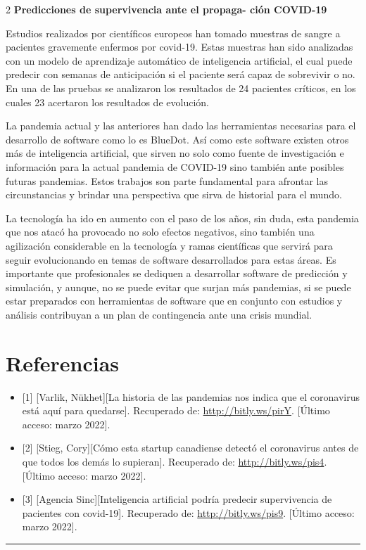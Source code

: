 \documentclass[12pt,spanish,Letterpaper,openany]{book}
\newcommand{\HRule}{\begin{center}\rule{0.5\linewidth}{0.2mm}\end{center}}
\begin{document}
\begin {multicols}{2}
\textbf{Predicciones de supervivencia ante el propaga-
ción COVID-19}

Estudios realizados por científicos europeos han tomado muestras de sangre a pacientes gravemente enfermos por covid-19. Estas muestras han sido analizadas con un modelo de aprendizaje automático de inteligencia artificial, el cual puede predecir con semanas de anticipación si el paciente será capaz de sobrevivir o no. En una de las pruebas se analizaron los resultados de 24 pacientes críticos, en los cuales 23 acertaron los resultados de evolución.

La pandemia actual y las anteriores han dado las herramientas necesarias para el desarrollo de software como lo es BlueDot. Así como este software existen otros más de inteligencia artificial, que sirven no solo como fuente de investigación e información para la actual pandemia de COVID-19 sino también ante posibles futuras pandemias. Estos trabajos son parte fundamental para afrontar las circunstancias y brindar una perspectiva que sirva de historial para el mundo.

La tecnología ha ido en aumento con el paso de los años, sin duda, esta pandemia que nos atacó ha provocado no solo efectos negativos, sino también una agilización considerable en la tecnología y ramas científicas que servirá para seguir evolucionando en temas de software desarrollados para estas áreas. Es importante que profesionales se dediquen a desarrollar software de predicción y simulación, y aunque, no se puede evitar que surjan más pandemias, si se puede estar preparados con herramientas de software que en conjunto con estudios y análisis contribuyan a un plan de contingencia ante una crisis mundial.

\hypertarget{referencias-17}{%
\section*{Referencias}\label{referencias-17}}

\begin{itemize}
\item
  {[}1{]} {[}Varlik, Nükhet{]}{[}La historia de las pandemias nos indica que el coronavirus está aquí para quedarse{]}. Recuperado de: \url{http://bitly.ws/pirY}. {[}Último acceso: marzo 2022{]}.
\item
  {[}2{]} {[}Stieg, Cory{]}{[}Cómo esta startup canadiense detectó el coronavirus antes de que todos los demás lo supieran{]}. Recuperado de: \url{http://bitly.ws/pis4}. {[}Último acceso: marzo 2022{]}.
\item
  {[}3{]} {[}Agencia Sinc{]}{[}Inteligencia artificial podría predecir supervivencia de pacientes con covid-19{]}. Recuperado de: \url{http://bitly.ws/pis9}. {[}Último acceso: marzo 2022{]}.
\end{itemize}

\end {multicols}
\medskip
\HRule
\medskip
\end{document}
